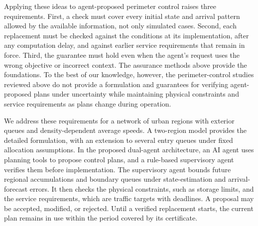 \documentclass[final]{cas-sc}
\theoremstyle{definition}
\theoremstyle{plain}
\theoremstyle{definition}
\theoremstyle{plain}
\begin{document}
Applying these ideas to agent-proposed perimeter control raises three
requirements. First, a check must cover every initial state and arrival
pattern allowed by the available information, not only simulated cases.
Second, each replacement must be checked against the conditions at its
implementation, after any computation delay, and against earlier service
requirements that remain in force. Third, the guarantee must hold even
when the agent's request uses the wrong objective or incorrect context.
The assurance methods above provide the foundations. To the best of
our knowledge, however, the
perimeter-control studies reviewed above do not provide a formulation
and guarantees for verifying agent-proposed plans under uncertainty
while maintaining physical constraints and service requirements as
plans change during operation.

We address these requirements for a network of urban regions with
exterior queues and density-dependent average speeds. A two-region model
provides the detailed formulation, with an extension to several entry
queues under fixed allocation assumptions. In the proposed dual-agent
architecture, an AI agent uses planning tools to propose control plans,
and a rule-based supervisory agent verifies them before implementation.
The supervisory agent bounds future regional accumulations and boundary
queues under state-estimation and arrival-forecast errors. It then
checks the physical constraints, such as storage limits, and the
service requirements, which are traffic targets with deadlines. A
proposal may be accepted, modified, or rejected. Until a verified
replacement starts, the current plan remains in use within the period
covered by its certificate.
\end{document}
